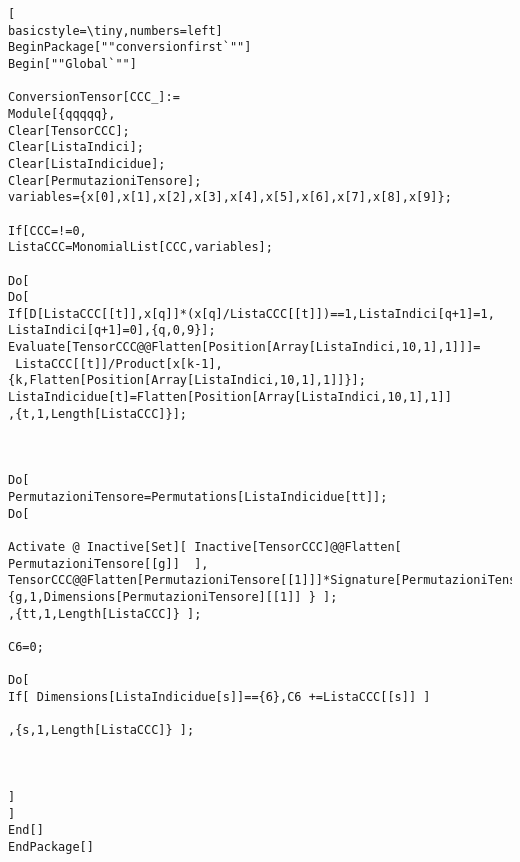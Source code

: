 \documentclass{beamer}
\begin{document}
\begin{frame}[fragile]
\begin{lstlisting}[
basicstyle=\tiny,numbers=left]
BeginPackage[""conversionfirst`""]
Begin[""Global`""]

ConversionTensor[CCC_]:=
Module[{qqqqq},
Clear[TensorCCC];
Clear[ListaIndici];
Clear[ListaIndicidue];
Clear[PermutazioniTensore];
variables={x[0],x[1],x[2],x[3],x[4],x[5],x[6],x[7],x[8],x[9]};

If[CCC=!=0,
ListaCCC=MonomialList[CCC,variables];

Do[
Do[
If[D[ListaCCC[[t]],x[q]]*(x[q]/ListaCCC[[t]])==1,ListaIndici[q+1]=1,
ListaIndici[q+1]=0],{q,0,9}];  
Evaluate[TensorCCC@@Flatten[Position[Array[ListaIndici,10,1],1]]]=
 ListaCCC[[t]]/Product[x[k-1],{k,Flatten[Position[Array[ListaIndici,10,1],1]]}]; 
ListaIndicidue[t]=Flatten[Position[Array[ListaIndici,10,1],1]]
,{t,1,Length[ListaCCC]}];



Do[
PermutazioniTensore=Permutations[ListaIndicidue[tt]];
Do[

Activate @ Inactive[Set][ Inactive[TensorCCC]@@Flatten[  PermutazioniTensore[[g]]  ], TensorCCC@@Flatten[PermutazioniTensore[[1]]]*Signature[PermutazioniTensore[[g]]]],  
{g,1,Dimensions[PermutazioniTensore][[1]] } ];
,{tt,1,Length[ListaCCC]} ];

C6=0;

Do[
If[ Dimensions[ListaIndicidue[s]]=={6},C6 +=ListaCCC[[s]] ] 

,{s,1,Length[ListaCCC]} ];



]
]
End[]
EndPackage[]

\end{lstlisting}
\end{frame}
\end{document}
